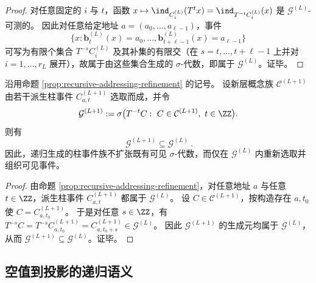 \begin{proof}
对任意固定的 \(i\) 与 \(t\)，函数 \(x\mapsto \ind_{C_i^{(L)}}(T^t x)=\ind_{T^{-t}C_i^{(L)}}(x)\) 是 \(\mathcal{G}^{(L)}\)-可测的。
因此对任意给定地址 \(a=(a_0,\dots,a_{\ell-1})\)，事件
\[
\{x:\mathbf b^{(L)}_t(x)=a_0,\dots,\mathbf b^{(L)}_{t+\ell-1}(x)=a_{\ell-1}\}
\]
可写为有限个集合 \(T^{-s}C_i^{(L)}\) 及其补集的有限交（在 \(s=t,\dots,t+\ell-1\) 上并对 \(i=1,\dots,r_L\) 展开），故属于由这些集合生成的 \(\sigma\)-代数，即属于 \(\mathcal{G}^{(L)}\)。证毕。
\end{proof}

\begin{corollary}\label{cor:recursive-addressing-visible-sigma-nonexpansion}
沿用命题 \ref{prop:recursive-addressing-refinement} 的记号。
设新层概念族 \(\mathcal{C}^{(L+1)}\) 由若干派生柱事件 \(C^{(L+1)}_{a,t}\) 选取而成，并令
\[
\mathcal{G}^{(L+1)}:=\sigma\bigl(T^{-t}C:\ C\in \mathcal{C}^{(L+1)},\ t\in\ZZ\bigr).
\]
则有
\[
\boxed{\ \mathcal{G}^{(L+1)}\subseteq \mathcal{G}^{(L)}\ }.
\]
因此，递归生成的柱事件族不扩张既有可见 \(\sigma\)-代数，而仅在 \(\mathcal{G}^{(L)}\) 内重新选取并组织可见事件。
\end{corollary}

\begin{proof}
由命题 \ref{prop:recursive-addressing-refinement}，对任意地址 \(a\) 与任意 \(t\in\ZZ\)，派生柱事件 \(C^{(L+1)}_{a,t}\) 都属于 \(\mathcal{G}^{(L)}\)。
设 \(C\in\mathcal{C}^{(L+1)}\)，按构造存在 \(a,t_0\) 使 \(C=C^{(L+1)}_{a,t_0}\)。
于是对任意 \(s\in\ZZ\)，有 \(T^{-s}C=T^{-s}C^{(L+1)}_{a,t_0}=C^{(L+1)}_{a,t_0+s}\in\mathcal{G}^{(L)}\)。
因此 \(\mathcal{G}^{(L+1)}\) 的生成元均属于 \(\mathcal{G}^{(L)}\)，从而 \(\mathcal{G}^{(L+1)}\subseteq \mathcal{G}^{(L)}\)。证毕。
\end{proof}

\subsection{空值到投影的递归语义}

